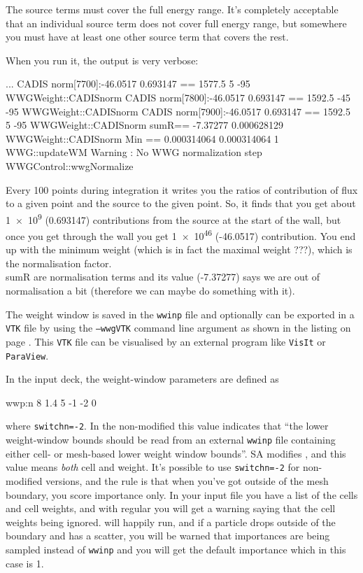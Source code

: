 The source terms must cover the full energy range.
It's completely acceptable that an individual source term does not cover full energy range,
but somewhere you must have at least one other source term that covers the rest.

When you run it, the output is very verbose:
\begin{bash}
...
CADIS norm[7700]:-46.0517 0.693147 == 1577.5 5 -95          WWGWeight::CADISnorm
CADIS norm[7800]:-46.0517 0.693147 == 1592.5 -45 -95        WWGWeight::CADISnorm
CADIS norm[7900]:-46.0517 0.693147 == 1592.5 5 -95          WWGWeight::CADISnorm
sumR== -7.37277 0.000628129                                 WWGWeight::CADISnorm
Min == 0.000314064 0.000314064 1                                  WWG::updateWM
Warning : No WWG normalization step                        WWGControl::wwgNormalize
\end{bash}

Every 100 points during integration it writes you the ratios of contribution of flux to a given point and the source to the given point.
So, it finds that you get about
\num[retain-unity-mantissa=false]{1e9} (0.693147) 
contributions from the source at the start of the wall, but once you get through the wall you get
\num[retain-unity-mantissa=false]{1e46} (-46.0517) contribution.
You end up with the minimum weight (which is in fact the maximal weight \alert{???}), which is the normalisation factor. \\
sumR are normalisation terms and its value (-7.37277) says we are out of normalisation a bit (therefore we can maybe do something with it).

The weight window is saved in the {\tt wwinp} file and optionally can be exported in a {\tt VTK} file by using the {\tt --wwgVTK} command line argument
as shown in the listing on page \pageref{bash:vr:cadis:mesh:run}.
This {\tt VTK} file can be visualised by an external program like {\tt VisIt} or {\tt ParaView}.

In the input deck, the weight-window parameters are defined as
\begin{deck}
 wwp:n 8 1.4 5 -1 -2 0
\end{deck}
where {\tt switchn=-2}. In the non-modified \mcnp this value indicates that ``the lower weight-window bounds should be read from an external {\tt wwinp} file
containing either cell- or mesh-based lower weight window bounds''.
SA modifies \mcnp, and this value means {\em both} cell and weight.
It's possible to use {\tt switchn=-2} for non-modified \mcnp versions, and the rule is that when you've got outside of the mesh boundary, you score
importance only. In your input file you have a list of the cells and cell weights, and with regular \mcnp you will get a warning saying that the cell weights being ignored.
\mcnp will happily run, and if a particle drops outside of the boundary and has a scatter, you will be warned that importances are being sampled instead of {\tt wwinp} 
and you will get the default importance which in this case is 1.

